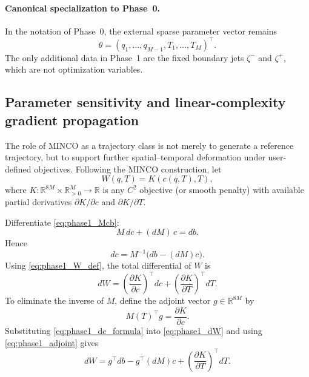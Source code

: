 \paragraph{Canonical specialization to Phase~0.}
In the notation of Phase~0, the external sparse parameter vector remains
\[
  \theta=(q_1,\dots,q_{M-1},T_1,\dots,T_M)^\top.
\]
The only additional data in Phase~1 are the fixed boundary jets $\zeta^-$ and $\zeta^+$, which are
not optimization variables.

\subsection{Parameter sensitivity and linear-complexity gradient propagation}
\label{subsec:phase1_sensitivity_gradient}

The role of MINCO as a trajectory class is not merely to generate a reference trajectory, but to
support further spatial--temporal deformation under user-defined objectives. Following the
MINCO construction, let
\begin{equation}
  \label{eq:phase1_W_def}
  W(q,T)=K(c(q,T),T),
\end{equation}
where $K:\mathbb R^{8M}\times\mathbb R^M_{>0}\to\mathbb R$ is any $C^2$ objective (or smooth penalty)
with available partial derivatives $\partial K/\partial c$ and $\partial K/\partial T$.

Differentiate \eqref{eq:phase1_Mcb}:
\begin{equation}
  \label{eq:phase1_diff_Mcb}
  M\,dc + (dM)\,c = db.
\end{equation}
Hence
\begin{equation}
  \label{eq:phase1_dc_formula}
  dc
  =
  M^{-1}\bigl(db-(dM)c\bigr).
\end{equation}
Using \eqref{eq:phase1_W_def}, the total differential of $W$ is
\begin{equation}
  \label{eq:phase1_dW}
  dW
  =
  \left(\frac{\partial K}{\partial c}\right)^\top dc
  +
  \left(\frac{\partial K}{\partial T}\right)^\top dT.
\end{equation}
To eliminate the inverse of $M$, define the adjoint vector $g\in\mathbb R^{8M}$ by
\begin{equation}
  \label{eq:phase1_adjoint}
  M(T)^\top g = \frac{\partial K}{\partial c}.
\end{equation}
Substituting \eqref{eq:phase1_dc_formula} into \eqref{eq:phase1_dW} and using
\eqref{eq:phase1_adjoint} gives
\begin{equation}
  \label{eq:phase1_dW_compact}
  dW
  =
  g^\top db
  -
  g^\top (dM)c
  +
  \left(\frac{\partial K}{\partial T}\right)^\top dT.
\end{equation}

